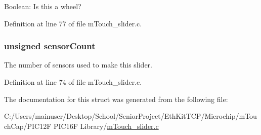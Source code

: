 Boolean\+: Is this a wheel? 



Definition at line 77 of file m\+Touch\+\_\+slider.\+c.

\hypertarget{structm_touch___slider_state_a87e15ba89028ea1a447211988f6b7d73}{}
\subsubsection[{sensor\+Count}]{\setlength{\rightskip}{0pt plus 5cm}unsigned sensor\+Count}\label{structm_touch___slider_state_a87e15ba89028ea1a447211988f6b7d73}


The number of sensors used to make this slider. 



Definition at line 74 of file m\+Touch\+\_\+slider.\+c.



The documentation for this struct was generated from the following file\+:\begin{DoxyCompactItemize}
\item 
C\+:/\+Users/mainuser/\+Desktop/\+School/\+Senior\+Project/\+Eth\+Kit\+T\+C\+P/\+Microchip/m\+Touch\+Cap/\+P\+I\+C12\+F P\+I\+C16\+F Library/\hyperlink{m_touch__slider_8c}{m\+Touch\+\_\+slider.\+c}\end{DoxyCompactItemize}
